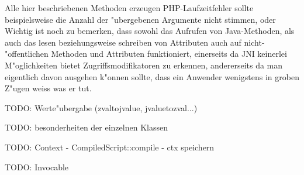 Alle hier beschriebenen Methoden erzeugen PHP-Laufzeitfehler sollte beispielsweise die Anzahl der "ubergebenen Argumente nicht stimmen, oder 
Wichtig ist noch zu bemerken, dass sowohl das Aufrufen von Java-Methoden, als auch das lesen beziehungsweise schreiben von Attributen auch auf nicht-"offentlichen
Methoden und Attributen funktioniert, einerseits da JNI keinerlei M"oglichkeiten bietet Zugriffsmodifikatoren zu erkennen, andererseits da man eigentlich davon
ausgehen k"onnen sollte, dass ein Anwender wenigstens in groben Z"ugen weiss was er tut. 

TODO: Werte"ubergabe (zvaltojvalue, jvaluetozval...)

TODO: besonderheiten der einzelnen Klassen


TODO: Context - CompiledScript::compile - ctx speichern

TODO: Invocable


